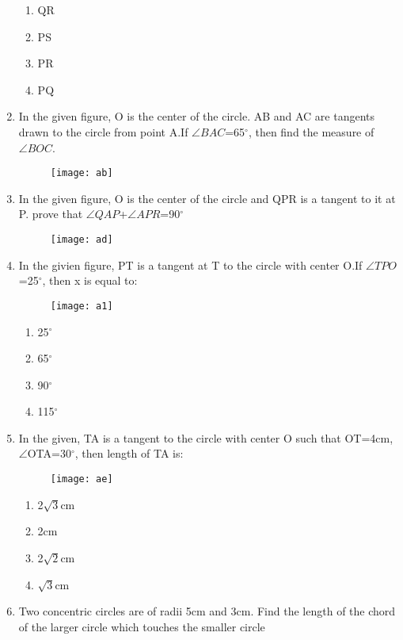 \documentclass{article}
\begin{document}
\begin{enumerate}
			\begin{enumerate}
				\item QR
				\item PS
				\item PR
				\item PQ
			\end{enumerate}
		
	\item In the given figure, O is the center of the circle. AB and AC are tangents drawn to the circle from point A.If $\angle{BAC}$=65$^\circ$, then find the measure of $\angle{BOC}$.
		\begin{figure}[h]
			\centering
			\texttt{[image: ab]}
		\end{figure}
	\item In the given figure, O is the center of the circle and QPR is a tangent to it at P. prove that $\angle{QAP}$+$\angle{APR}$=90$^\circ$
		\begin{figure}[h]
			\centering
			\texttt{[image: ad]}
		\end{figure}
	\item In the givien figure, PT is a tangent at T to the circle  with center O.If $\angle{TPO}$=25$^\circ$, then x is equal to:
		\begin{figure}[h]
			\centering
			\texttt{[image: a1]}
		\end{figure}
		\begin{enumerate}
			\item 25$^\circ$
			\item 65$^\circ$
			\item 90$^\circ$
			\item 115$^\circ$
		\end{enumerate}
	\item In the given, TA is a tangent to the circle with center O such that OT=4cm, $\angle${OTA}=30$^\circ$, then length of TA is:
		\begin{figure}[h]
			\centering
			\texttt{[image: ae]}
		\end{figure}
	        \begin{enumerate}
			\item 2$\sqrt{3}$cm
			\item 2cm
			\item 2$\sqrt{2}$cm
			\item $\sqrt{3}$cm
		\end{enumerate}
	\item Two concentric circles are of radii 5cm and 3cm. Find the length of the chord of the larger circle which touches the smaller circle



\end{enumerate}
\end{document}
